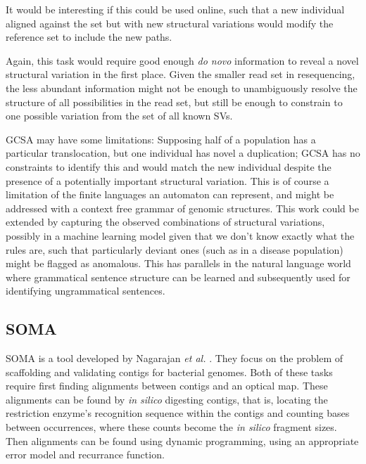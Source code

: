 It would be interesting if this could be used online, such that a new individual aligned against the set but with new structural variations would modify the reference set to include the new paths.  

Again, this task would require good enough \emph{do novo} information to reveal a novel structural variation in the first place.  Given the smaller read set in resequencing, the less abundant information might not be enough to unambiguously resolve the structure of all possibilities in the read set, but still be enough to constrain to one possible variation from the set of all known SVs.  

GCSA may have some limitations: Supposing half of a population has a particular translocation, but one individual has novel a duplication; GCSA has no constraints to identify this and would match the new individual despite the presence of a potentially important structural variation. This is of course a limitation of the finite languages an automaton can represent, and might be addressed with a context free grammar of genomic structures.  This work could be extended by capturing the observed combinations of structural variations, possibly in a machine learning model given that we don't know exactly what the rules are, such that particularly deviant ones (such as in a disease population) might be flagged as anomalous.  This has parallels in the natural language world where grammatical sentence structure can be learned and subsequently used for identifying ungrammatical sentences.


\subsection{SOMA}

SOMA is a tool developed  by Nagarajan \emph{et al.} \cite{nagarajan2008}. They focus on the problem of scaffolding and validating contigs for bacterial genomes.
Both of these tasks require first finding alignments between contigs and an optical map.
These alignments can be found by \emph{in silico} digesting contigs, that is, locating the restriction enzyme's recognition sequence within the contigs and counting bases between occurrences, where these counts become the \emph{in silico} fragment sizes.
Then alignments can be found using dynamic programming, using an appropriate error model and recurrance function. 


